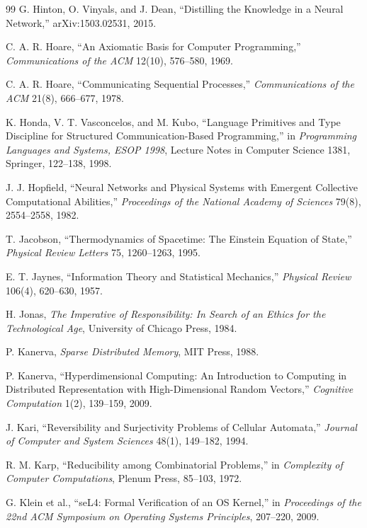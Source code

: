 \documentclass[11pt,twoside,openright]{book}
\theoremstyle{plain}
\theoremstyle{definition}
\theoremstyle{remark}
\begin{document}
\begin{thebibliography}{99}
 G. Hinton, O. Vinyals, and J. Dean, ``Distilling the Knowledge in a Neural Network,'' arXiv:1503.02531, 2015.

 C. A. R. Hoare, ``An Axiomatic Basis for Computer Programming,'' \emph{Communications of the ACM} 12(10), 576--580, 1969.

 C. A. R. Hoare, ``Communicating Sequential Processes,'' \emph{Communications of the ACM} 21(8), 666--677, 1978.

 K. Honda, V. T. Vasconcelos, and M. Kubo, ``Language Primitives and Type Discipline for Structured Communication-Based Programming,'' in \emph{Programming Languages and Systems, ESOP 1998}, Lecture Notes in Computer Science 1381, Springer, 122--138, 1998.

 J. J. Hopfield, ``Neural Networks and Physical Systems with Emergent Collective Computational Abilities,'' \emph{Proceedings of the National Academy of Sciences} 79(8), 2554--2558, 1982.

 T. Jacobson, ``Thermodynamics of Spacetime: The Einstein Equation of State,'' \emph{Physical Review Letters} 75, 1260--1263, 1995.

 E. T. Jaynes, ``Information Theory and Statistical Mechanics,'' \emph{Physical Review} 106(4), 620--630, 1957.

 H. Jonas, \emph{The Imperative of Responsibility: In Search of an Ethics for the Technological Age}, University of Chicago Press, 1984.

 P. Kanerva, \emph{Sparse Distributed Memory}, MIT Press, 1988.

 P. Kanerva, ``Hyperdimensional Computing: An Introduction to Computing in Distributed Representation with High-Dimensional Random Vectors,'' \emph{Cognitive Computation} 1(2), 139--159, 2009.

 J. Kari, ``Reversibility and Surjectivity Problems of Cellular Automata,'' \emph{Journal of Computer and System Sciences} 48(1), 149--182, 1994.

 R. M. Karp, ``Reducibility among Combinatorial Problems,'' in \emph{Complexity of Computer Computations}, Plenum Press, 85--103, 1972.

 G. Klein et al., ``seL4: Formal Verification of an OS Kernel,'' in \emph{Proceedings of the 22nd ACM Symposium on Operating Systems Principles}, 207--220, 2009.


\end{thebibliography}
\end{document}
